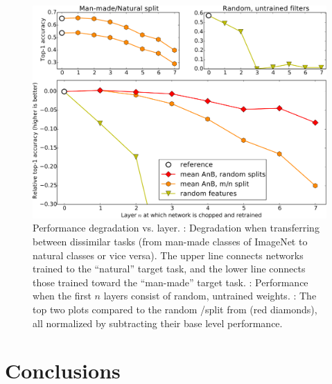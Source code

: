 \begin{figure}[t]
\begin{center}
\includegraphics[width=1.0\linewidth]{plots/result_random_nm_combined_crop.pdf}
\end{center}
\caption{Performance degradation vs. layer.
: Degradation when transferring between dissimilar tasks (from man-made classes of ImageNet to natural classes or vice versa). The upper line connects networks trained to the ``natural'' target task, and the lower line connects those trained toward the ``man-made'' target task.
: Performance when the first $n$ layers consist of random, untrained weights.
: The top two plots compared to the random \dA/\dB split from  (red diamonds), all normalized by subtracting their base level performance.}
\end{figure}



\section{Conclusions}

\vspace*{-1ex}

